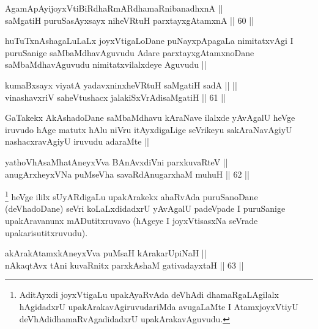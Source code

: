 \begin{shl}
AgamApAyijoyxVtiBiRdhaRmARdhamaRnibanadhxnA || \\
saMgatiH puruSasAyxsayx niheVRtuH parxtayxgAtamxnA ||  60 ||  
\end{shl}

\begin{artha}
 huTuTxnAshagaLuLaLx joyxVtigaLoDane puNayxpApagaLa nimitatxvAgi I puruSanige saMbaMdhavAguvudu Adare parxtayxgAtamxnoDane saMbaMdhavAguvudu nimitatxvilalxdeye Aguvudu ||
\end{artha}


\begin{shl}
kumaBxsayx viyatA yadavxninxheVRtuH saMgatiH sadA ||  || \\
vinashavxriV saheVtushacx jalakiSxVrAdisaMgatiH ||  61 ||  
\end{shl}

\begin{artha}
 GaTakekx AkAshadoDane saMbaMdhavu kAraNave ilalxde yAvAgalU heVge iruvudo hAge matutx hAlu niVru itAyxdigaLige seVrikeyu sakAraNavAgiyU nashacxravAgiyU iruvudu adaraMte ||
\end{artha}


\begin{shl}
yathoVhAsaMhatAneyxVva BAnAvxdiVni parxkuvaRteV || \\
anugArxheyxVNa puMseVha savaRdA\s nugarxhaM muhuH ||  62 ||  
\end{shl}

\begin{artha}
\footnote{AditAyxdi joyxVtigaLu upakAyaRvAda deVhAdi dhamaRgaLAgilalx hAgidadxrU upakArakavAgiruvudariMda avugaLaMte I AtamxjoyxVtiyU deVhAdidhamaRvAgadidadxrU upakArakavAguvudu.} heVge ililx sUyARdigaLu upakArakekx ahaRvAda puruSanoDane (deVhadoDane) seVri koLaLxdidadxrU yAvAgalU padeVpade I puruSanige upakAravanunx mADutitxruvavo (hAgeye I joyxVtisasxNa seVrade upakarisutitxruvudu).
\end{artha}


\begin{shl}
akArakAtamxkAneyxVva puMsaH kArakarUpiNaH || \\
nAkaqtAvx tAni kuvaRnitx parxkAshaM gativadayxtaH ||  63 ||  
\end{shl}

